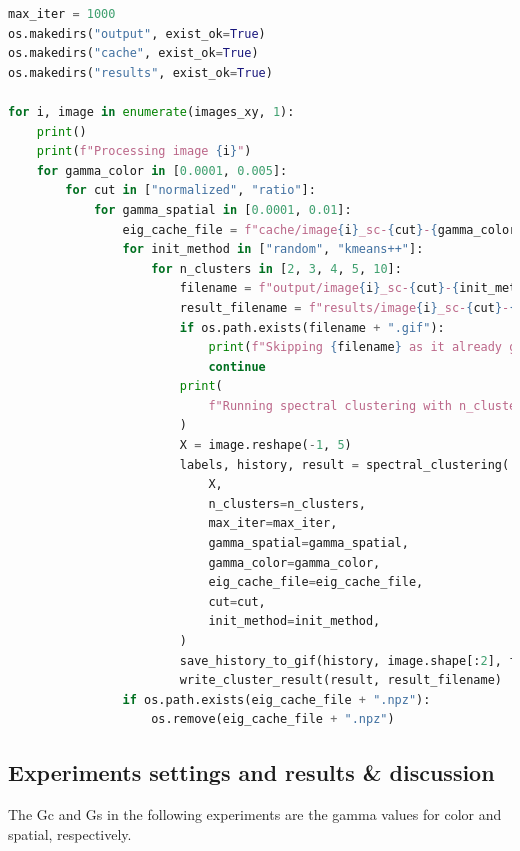 \documentclass{homework}
\begin{document}
\begin{lstlisting}[language=Python]
max_iter = 1000
os.makedirs("output", exist_ok=True)
os.makedirs("cache", exist_ok=True)
os.makedirs("results", exist_ok=True)

for i, image in enumerate(images_xy, 1):
    print()
    print(f"Processing image {i}")
    for gamma_color in [0.0001, 0.005]:
        for cut in ["normalized", "ratio"]:
            for gamma_spatial in [0.0001, 0.01]:
                eig_cache_file = f"cache/image{i}_sc-{cut}-{gamma_color}-{gamma_spatial}"
                for init_method in ["random", "kmeans++"]:
                    for n_clusters in [2, 3, 4, 5, 10]:
                        filename = f"output/image{i}_sc-{cut}-{init_method}-{n_clusters}-{gamma_color}-{gamma_spatial}"
                        result_filename = f"results/image{i}_sc-{cut}-{init_method}-{n_clusters}-{gamma_color}-{gamma_spatial}.txt"
                        if os.path.exists(filename + ".gif"):
                            print(f"Skipping {filename} as it already generated")
                            continue
                        print(
                            f"Running spectral clustering with n_clusters={n_clusters}, gamma_color={gamma_color}, gamma_spatial={gamma_spatial}, cut={cut}, init_method={init_method}"
                        )
                        X = image.reshape(-1, 5)
                        labels, history, result = spectral_clustering(
                            X,
                            n_clusters=n_clusters,
                            max_iter=max_iter,
                            gamma_spatial=gamma_spatial,
                            gamma_color=gamma_color,
                            eig_cache_file=eig_cache_file,
                            cut=cut,
                            init_method=init_method,
                        )
                        save_history_to_gif(history, image.shape[:2], filename)
                        write_cluster_result(result, result_filename)
                if os.path.exists(eig_cache_file + ".npz"):
                    os.remove(eig_cache_file + ".npz")
\end{lstlisting}

\subsection{Experiments settings and results \& discussion}

The Gc and Gs in the following experiments are the gamma values for color and spatial, respectively.
\end{document}
